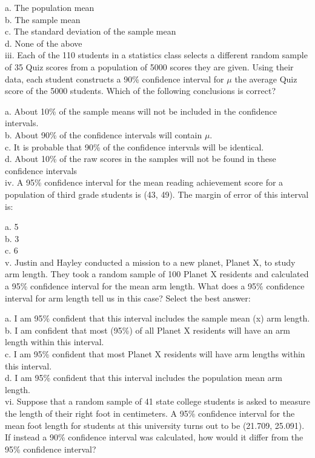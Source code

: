 \documentclass[11pt]{isuthesis}\usepackage[]{graphicx}\usepackage[]{color}
\begin{document}
\begin{appendices}
a. The population mean\\
b. The sample mean\\
c. The standard deviation of the sample mean\\
d. None of the above\\

iii. Each of the 110 students in a statistics class selects a different random sample of 35 Quiz scores from a population of 5000 scores they are given. Using their data, each student constructs a 90\% confidence interval for $\mu$ the average Quiz score of the
5000 students. Which of the following conclusions is correct?

a. About 10\% of the sample means will not be included in the confidence intervals.\\
b. About 90\% of the confidence intervals will contain $\mu$.\\
c. It is probable that 90\% of the confidence intervals will be identical.\\
d. About 10\% of the raw scores in the samples will not be found in these confidence intervals\\

iv. A 95\% confidence interval for the mean reading achievement score for a population of third grade students is (43, 49). The margin of error of this interval is:

a. 5\\
b. 3\\
c. 6\\

v. Justin and Hayley conducted a mission to a new planet, Planet X, to study arm length. They took a random sample of 100 Planet X residents and calculated a 95\% confidence interval for the mean arm length. What does a 95\% confidence interval for arm length tell us in this case? Select the best answer:

a. I am 95\% confident that this interval includes the sample mean (x) arm length.\\
b. I am confident that most (95\%) of all Planet X residents will have an arm length within this interval.\\
c. I am 95\% confident that most Planet X residents will have arm lengths within this interval.\\
d. I am 95\% confident that this interval includes the population mean arm length.\\


vi. Suppose that a random sample of 41 state college students is asked to measure the length of their right foot in centimeters. A 95\% confidence interval for the mean foot length for students at this university turns out to be (21.709, 25.091). If instead a 90\% confidence interval was calculated, how would it differ from the 95\% confidence interval?


\end{appendices}
\end{document}
